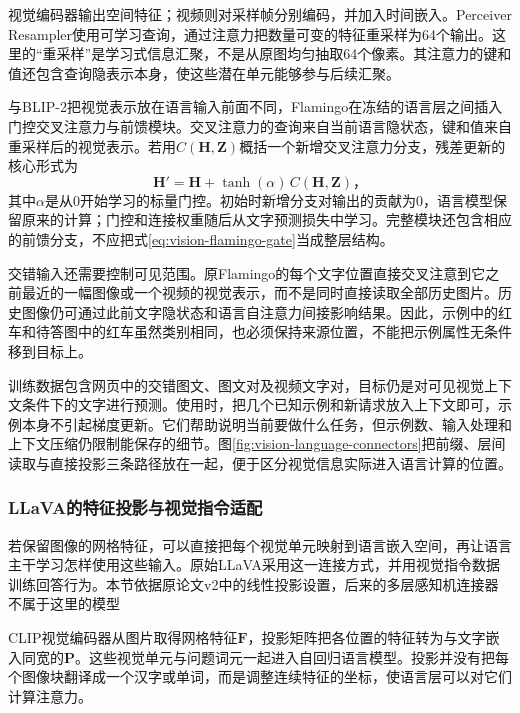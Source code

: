 视觉编码器输出空间特征；视频则对采样帧分别编码，并加入时间嵌入。Perceiver Resampler使用可学习查询，通过注意力把数量可变的特征重采样为64个输出。这里的“重采样”是学习式信息汇聚，不是从原图均匀抽取64个像素。其注意力的键和值还包含查询隐表示本身，使这些潜在单元能够参与后续汇聚。

与BLIP-2把视觉表示放在语言输入前面不同，Flamingo在冻结的语言层之间插入门控交叉注意力与前馈模块。交叉注意力的查询来自当前语言隐状态，键和值来自重采样后的视觉表示。若用$C(\bm H,\bm Z)$概括一个新增交叉注意力分支，残差更新的核心形式为
\begin{equation}
  \bm H'=\bm H+\tanh(\alpha)\,C(\bm H,\bm Z)\text{，}
  \label{eq:vision-flamingo-gate}
\end{equation}
其中$\alpha$是从0开始学习的标量门控。初始时新增分支对输出的贡献为0，语言模型保留原来的计算；门控和连接权重随后从文字预测损失中学习。完整模块还包含相应的前馈分支，不应把式\eqref{eq:vision-flamingo-gate}当成整层结构。

交错输入还需要控制可见范围。原Flamingo的每个文字位置直接交叉注意到它之前最近的一幅图像或一个视频的视觉表示，而不是同时直接读取全部历史图片。历史图像仍可通过此前文字隐状态和语言自注意力间接影响结果。因此，示例中的红车和待答图中的红车虽然类别相同，也必须保持来源位置，不能把示例属性无条件移到目标上。

训练数据包含网页中的交错图文、图文对及视频文字对，目标仍是对可见视觉上下文条件下的文字进行预测。使用时，把几个已知示例和新请求放入上下文即可，示例本身不引起梯度更新。它们帮助说明当前要做什么任务，但示例数、输入处理和上下文压缩仍限制能保存的细节。图\ref{fig:vision-language-connectors}把前缀、层间读取与直接投影三条路径放在一起，便于区分视觉信息实际进入语言计算的位置。

\subsubsection{LLaVA的特征投影与视觉指令适配}
\label{sec:vision-models-llava}

若保留图像的网格特征，可以直接把每个视觉单元映射到语言嵌入空间，再让语言主干学习怎样使用这些输入。原始LLaVA采用这一连接方式，并用视觉指令数据训练回答行为。本节依据原论文v2中的线性投影设置，后来的多层感知机连接器不属于这里的模型

CLIP视觉编码器从图片取得网格特征$\bm F$，投影矩阵把各位置的特征转为与文字嵌入同宽的$\bm P$。这些视觉单元与问题词元一起进入自回归语言模型。投影并没有把每个图像块翻译成一个汉字或单词，而是调整连续特征的坐标，使语言层可以对它们计算注意力。


